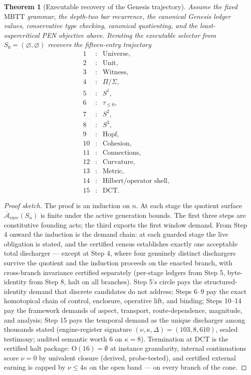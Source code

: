 \documentclass[11pt]{article}
\theoremstyle{plain}
\newtheorem{theorem}{Theorem}[section]
\theoremstyle{definition}
\theoremstyle{remark}
\newenvironment{proofsketch}{\begin{proof}[Proof sketch]}{\end{proof}}
\newcommand{\DCT}{\mathrm{DCT}}
\newcommand{\MBTT}{\mathrm{MBTT}}
\newcommand{\A}{\mathcal{A}}
\begin{document}
\begin{theorem}[Executable recovery of the Genesis trajectory]
Assume the fixed \(\MBTT\) grammar, the depth-two bar recurrence, the canonical Genesis ledger values, conservative type checking, canonical quotienting, and the least-supercritical PEN objective above. Iterating the executable selector from \(S_0=(\varnothing,\varnothing)\) recovers the fifteen-entry trajectory
\[
\begin{array}{rcl}
1&:&\text{Universe},\\
2&:&\text{Unit},\\
3&:&\text{Witness},\\
4&:&\Pi/\Sigma,\\
5&:&S^1,\\
6&:&\tau_{\le0},\\
7&:&S^2,\\
8&:&S^3,\\
9&:&\text{Hopf},\\
10&:&\text{Cohesion},\\
11&:&\text{Connections},\\
12&:&\text{Curvature},\\
13&:&\text{Metric},\\
14&:&\text{Hilbert/operator shell},\\
15&:&\DCT.
\end{array}
\]
\end{theorem}

\begin{proofsketch}
The proof is an induction on \(n\). At each stage the quotient surface \(\overline{\A}_{\mathrm{exec}}(S_n)\) is finite under the active generation bounds. The first three steps are constitutive founding acts; the third exports the first window demand. From Step 4 onward the induction is the demand chain: at each guarded stage the live obligation is stated, and the certified census establishes exactly one acceptable total discharger --- except at Step 4, where four genuinely distinct dischargers survive the quotient and the induction proceeds on the enacted branch, with cross-branch invariance certified separately (per-stage ledgers from Step 5, byte-identity from Step 8, halt on all branches). Step 5's circle pays the structured-identity demand that discrete candidates do not address; Steps 6--9 pay the exact homotopical chain of control, enclosure, operative lift, and binding; Steps 10--14 pay the framework demands of aspect, transport, route-dependence, magnitude, and analysis; Step 15 pays the temporal demand as the unique discharger among thousands stated (engine-register signature \((\nu,\kappa,\Delta)=(103,8,610)\), sealed testimony; audited semantic worth \(6\) on \(\kappa=8\)). Termination at \(\DCT\) is the certified halt package: \(\mathrm{O}(16)=\emptyset\) at instance granularity, internal continuations score \(\nu=0\) by univalent closure (derived, probe-tested), and certified external earning is capped by \(\nu\le4\kappa\) on the open band --- on every branch of the cone.
\end{proofsketch}
\end{document}
